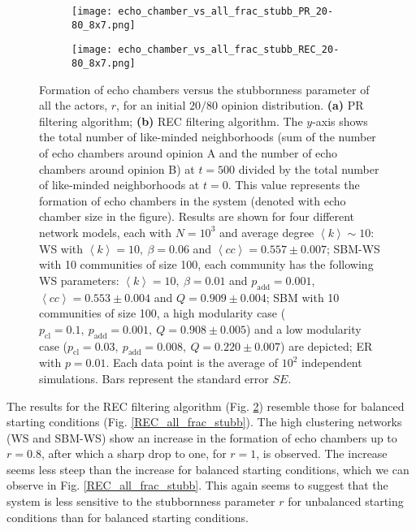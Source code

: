 \documentclass[11 pt , letterpaper , twoside , openright]{book}
\begin{document}
\begin{figure}[H]
  \begin{subfigure}[b]{0.49\textwidth}
    \caption{}
  	\texttt{[image: echo\_chamber\_vs\_all\_frac\_stubb\_PR\_20-80\_8x7.png]}
    \label{PR_all_frac_stubb_20-80}
  \end{subfigure}
  \begin{subfigure}[b]{0.49\textwidth}
    \caption{}
  	\texttt{[image: echo\_chamber\_vs\_all\_frac\_stubb\_REC\_20-80\_8x7.png]}
    \label{REC_all_frac_stubb_20-80}
  \end{subfigure}
  \captionsetup{format=plain}
  \caption[Formation of echo chambers versus the stubbornness parameter of all the actors, $r$, for the PR and REC filtering algorithms and an initial $20/80$ opinion distribution.]{Formation of echo chambers versus the stubbornness parameter of all the actors, $r$, for an initial $20/80$ opinion distribution. \textbf{(a)} PR filtering algorithm; \textbf{(b)} REC filtering algorithm. The $y$-axis shows the total number of like-minded neighborhoods (sum of the number of echo chambers around opinion A and the number of echo chambers around opinion B) at $t=500$ divided by the total number of like-minded neighborhoods at $t=0$. This value represents the formation of echo chambers in the system (denoted with echo chamber size in the figure). Results are shown for four different network models, each with $N=10^3$ and average degree $\left<k\right> \sim 10$: WS with $\left<k\right> =10,\ \beta = 0.06$ and $\left<cc\right> = 0.557 \pm 0.007$; SBM-WS with 10 communities of size 100, each community has the following WS parameters: $\left<k\right> = 10,\ \beta = 0.01$ and $p_{\text{add}} = 0.001$, $\left<cc\right> = 0.553 \pm 0.004$ and $Q = 0.909 \pm 0.004$; SBM with 10 communities of size 100, a high modularity case ($p_{\text{cl}} = 0.1,\ p_{\text{add}} = 0.001,\ Q = 0.908 \pm 0.005$) and a low modularity case ($p_{\text{cl}} = 0.03,\ p_{\text{add}} = 0.008,\ Q = 0.220 \pm 0.007$) are depicted; ER with $p= 0.01$. Each data point is the average of $10^2$ independent simulations. Bars represent the standard error $SE$.}
\label{echo_vs_all_frac_stubb_PR-REC_20-80}
\end{figure}
\noindent
The results for the REC filtering algorithm (Fig. \ref{REC_all_frac_stubb_20-80}) resemble those for balanced starting conditions (Fig. \ref{REC_all_frac_stubb}). The high clustering networks (WS and SBM-WS) show an increase in the formation of echo chambers up to $r=0.8$, after which a sharp drop to one, for $r=1$, is observed. The increase seems less steep than the increase for balanced starting conditions, which we can observe in Fig. \ref{REC_all_frac_stubb}. This again seems to suggest that the system is less sensitive to the stubbornness parameter $r$ for unbalanced starting conditions than for balanced starting conditions.\\
\end{document}
